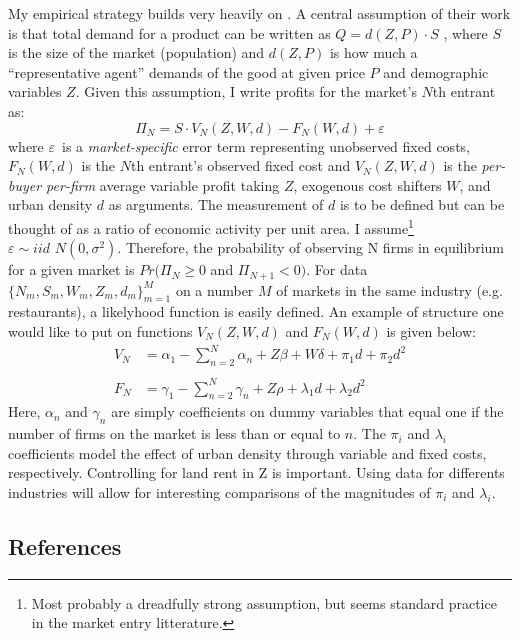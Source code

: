 \documentclass{article}
\begin{document}
\vspace{2mm}

My empirical strategy builds very heavily on \cite{bresnahan1991entry}. A central assumption of their work is that total demand for a product can be written as $Q=d(Z,P)\cdot S$ , where $S$ is the size of the market (population) and $d(Z,P)$ is how much a ``representative agent'' demands of the good at given price $P$ and demographic variables $Z$. Given this assumption, I write profits for the market's $N$th entrant as:
\begin{equation*}
\Pi_N = S\cdot V_N(Z,W,d) - F_N(W,d) + \varepsilon
\end{equation*}
\noindent where $\varepsilon\,$ is a {\it market-specific} error term representing unobserved fixed costs, $F_N(W,d)$ is the $N$th entrant's observed fixed cost and $V_N(Z,W,d)$ is the {\it per-buyer per-firm} average variable profit taking $Z$, exogenous cost shifters $W$, and urban density $d$ as arguments. The measurement of $d$ is to be defined but can be thought of as a ratio of economic activity per unit area. I assume\footnote{Most probably a dreadfully strong assumption, but seems standard practice in the market entry litterature.} $\varepsilon \sim iid \,\, N(0,\sigma^2)$. Therefore, the probability of observing N firms in equilibrium for a given market is $Pr(\Pi_N \geq0$ and $\Pi_{N+1} < 0)$. For data $\{N_m,S_m,W_m,Z_m,d_m\}_{m=1}^M$ on a number $M$ of markets in the same industry (e.g. restaurants), a likelyhood function is easily defined. An example of structure one would like to put on functions $V_N(Z,W,d)$ and $F_N(W,d)$  is given below:
\begin{align*}
V_N &= \alpha_1 - \sum\limits_{n=2}^N \alpha_n + Z\beta + W\delta + \pi_1 d + \pi_2 d^2 \\ \\[-0.8em]
F_N &= \gamma_1 - \sum\limits_{n=2}^N \gamma_n + Z\rho  + \lambda_1 d + \lambda_2 d^2
\end{align*}
\noindent Here, $\alpha_n$ and $\gamma_n$ are simply coefficients on dummy variables that equal one if the number of firms on the market is less than or equal to $n$. The $\pi_i$ and $\lambda_i$ coefficients model the effect of urban density through variable and fixed costs, respectively. Controlling for land rent in Z is important. Using data for differents industries will allow for interesting comparisons of the magnitudes of $\pi_i$ and $\lambda_i$.












\subsection*{References}


\end{document}
